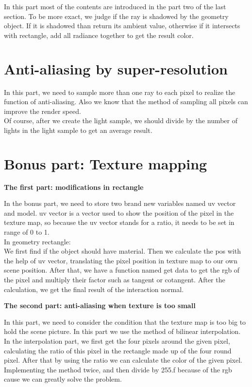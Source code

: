 \documentclass[acmtog]{acmart}
\begin{document}
In this part most of the contents are introduced in the part two of the last section. To be more exact, we judge if the ray is shadowed by the geometry object. If it is shadowed than return its ambient value, otherwise if it intersects with rectangle, add all radiance together to get the result color.

\section{Anti-aliasing by super-resolution}

In this part, we need to sample more than one ray to each pixel to realize the function of anti-aliasing. Also we know that the method of sampling all pixels can improve the render speed.\\
Of course, after we create the light sample, we should divide by the number of lights in the light sample to get an average result.

\section{Bonus part: Texture mapping}

\textbf{The first part: modifications in rectangle}

In the bonus part, we need to store two brand new variables named uv vector and model. uv vector is a vector used to show the position of the pixel in the texture map, so because the uv vector stands for a ratio, it needs to be set in range of 0 to 1. \\
In geometry rectangle: \\
We first find if the object should have material. Then we calculate the pos with the help of uv vector, translating the pixel position in texture map to our own scene position. After that, we have a function named get data to get the rgb of the pixel and multiply their factor such as tangent or cotangent. After the calculation, we get the final result of the interaction normal.

\textbf{The second part: anti-aliasing when texture is too small}

In this part, we need to consider the condition that the texture map is too big to hold the scene picture. In this part we use the method of bilinear interpolation. \\
In the interpolation part, we first get the four pixels around the given pixel, calculating the ratio of this pixel in the rectangle made up of the four round pixel. After that by using the ratio we can calculate the color of the given pixel. Implementing the method twice, and then divide by 255.f because of the rgb cause we can greatly solve the problem.
\end{document}
